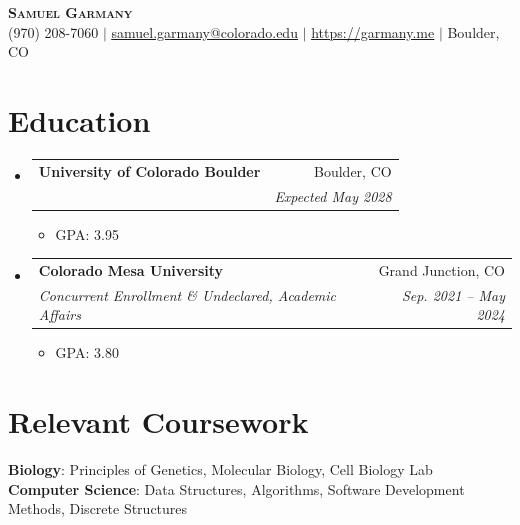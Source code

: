 \documentclass[letterpaper,11pt]{article}
\makeatletter
\newcommand{\resumeItem}[1]{
  \item\small{
    {#1 \vspace{-2pt}}
  }
}
\newcommand{\resumeSubheading}[4]{
  \vspace{-2pt}\item
    \begin{tabular*}{0.97\textwidth}[t]{l@{\extracolsep{\fill}}r}
      \textbf{#1} & #2 \\
      \textit{\small#3} & \textit{\small #4} \\
    \end{tabular*}\vspace{-7pt}
}
\newcommand{\resumeSubHeadingListStart}{\begin{itemize}[leftmargin=0.15in, label={}]}
\newcommand{\resumeSubHeadingListEnd}{\end{itemize}}
\newcommand{\resumeItemListStart}{\begin{itemize}}
\newcommand{\resumeItemListEnd}{\end{itemize}\vspace{-5pt}}
\makeatother
\begin{document}

\begin{center}
	\textbf{\Huge \scshape Samuel Garmany} \\ \vspace{1pt}
	\small (970) 208-7060 $|$ \href{mailto:samuel.garmany@colorado.edu}{\underline{samuel.garmany@colorado.edu}} $|$
	\href{https://garmany.me}{\underline{https://garmany.me}} $|$
	Boulder, CO
\end{center}


\section{Education}
\resumeSubHeadingListStart
\resumeSubheading
{University of Colorado Boulder}{Boulder, CO}
{\parbox[t]{0.8\textwidth}{
		Bachelor of Arts in Molecular, Cellular \& Developmental Biology, College of Arts \& Sciences\\
		Bachelor of Arts in Computer Science, College of Engineering \& Applied Science}\vspace{2pt}}{Expected May 2028}
\resumeItemListStart
\resumeItem{GPA: 3.95}
\resumeItemListEnd
\resumeSubheading
{Colorado Mesa University}{Grand Junction, CO}
{Concurrent Enrollment \& Undeclared, Academic Affairs}{Sep. 2021 -- May 2024}
\resumeItemListStart
\resumeItem{GPA: 3.80}
\resumeItemListEnd
\resumeSubHeadingListEnd

\section{Relevant Coursework}
\begin{itemize}[leftmargin=0.15in, label={}]
	\small{\item{
		            \textbf{Biology}{: Principles of Genetics, Molecular Biology, Cell Biology Lab} \\
		            \textbf{Computer Science}{: Data Structures, Algorithms, Software Development Methods, Discrete Structures}
		      }}
\end{itemize}
\end{document}
